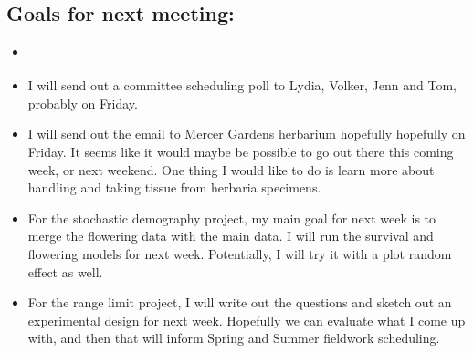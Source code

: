 \documentclass{article}
\newcommand{\tom}[1]{{\textit{\color{WildStrawberry}{[#1]}}}}
\begin{document}
\subsection*{Goals for next meeting:}
\begin{itemize}
\item{\tom{I think it would be preferable to organize goals by project. Each project really has its own list.}}
\item{I will send out a committee scheduling poll to Lydia, Volker, Jenn and Tom, probably on Friday.}
\item{I will send out the email to Mercer Gardens herbarium hopefully hopefully on Friday. It seems like it would maybe be possible to go out there this coming week, or next weekend. One thing I would like to do is learn more about handling and taking tissue from herbaria specimens.}
\item{For the stochastic demography project, my main goal for next week is to merge the flowering data with the main data. I will run the survival and flowering models for next week. Potentially, I will try it with a plot random effect as well.}
\item{For the range limit project, I will write out the questions and sketch out an experimental design for next week. Hopefully we can evaluate what I come up with, and then that will inform Spring and Summer fieldwork scheduling.}
\end{itemize}
\end{document}
